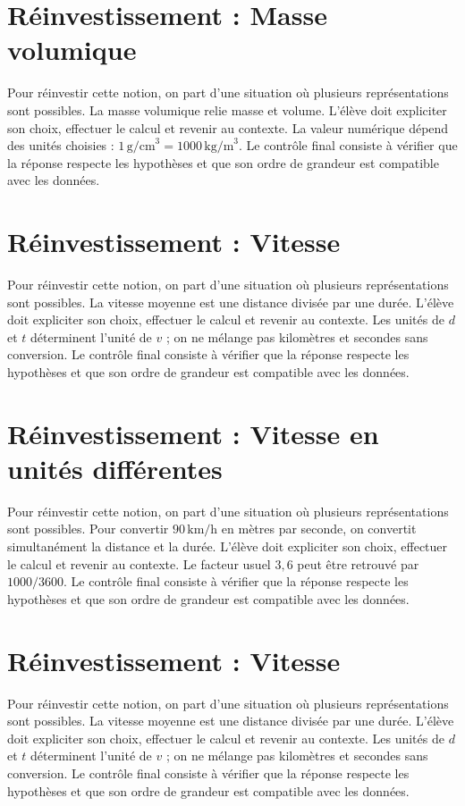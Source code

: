 \section{Réinvestissement : Masse volumique}
Pour réinvestir cette notion, on part d’une situation où plusieurs représentations sont possibles. La masse volumique relie masse et volume. L’élève doit expliciter son choix, effectuer le calcul et revenir au contexte. La valeur numérique dépend des unités choisies : $1\,\text{g/cm}^3=1000\,\text{kg/m}^3$. Le contrôle final consiste à vérifier que la réponse respecte les hypothèses et que son ordre de grandeur est compatible avec les données.

\section{Réinvestissement : Vitesse}
Pour réinvestir cette notion, on part d’une situation où plusieurs représentations sont possibles. La vitesse moyenne est une distance divisée par une durée. L’élève doit expliciter son choix, effectuer le calcul et revenir au contexte. Les unités de $d$ et $t$ déterminent l’unité de $v$ ; on ne mélange pas kilomètres et secondes sans conversion. Le contrôle final consiste à vérifier que la réponse respecte les hypothèses et que son ordre de grandeur est compatible avec les données.

\section{Réinvestissement : Vitesse en unités différentes}
Pour réinvestir cette notion, on part d’une situation où plusieurs représentations sont possibles. Pour convertir $90\,\text{km/h}$ en mètres par seconde, on convertit simultanément la distance et la durée. L’élève doit expliciter son choix, effectuer le calcul et revenir au contexte. Le facteur usuel $3{,}6$ peut être retrouvé par $1000/3600$. Le contrôle final consiste à vérifier que la réponse respecte les hypothèses et que son ordre de grandeur est compatible avec les données.

\section{Réinvestissement : Vitesse}
Pour réinvestir cette notion, on part d’une situation où plusieurs représentations sont possibles. La vitesse moyenne est une distance divisée par une durée. L’élève doit expliciter son choix, effectuer le calcul et revenir au contexte. Les unités de $d$ et $t$ déterminent l’unité de $v$ ; on ne mélange pas kilomètres et secondes sans conversion. Le contrôle final consiste à vérifier que la réponse respecte les hypothèses et que son ordre de grandeur est compatible avec les données.
